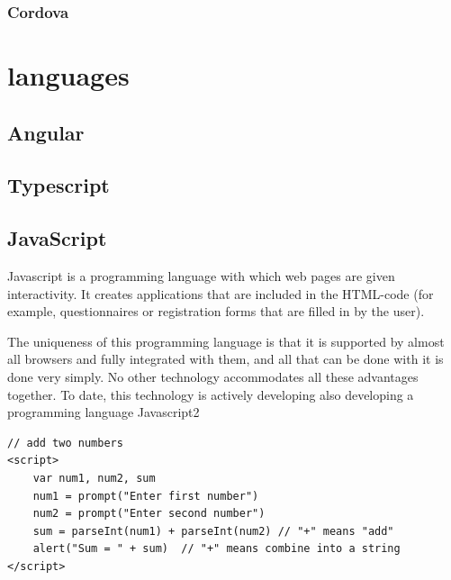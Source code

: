 \subsubsection{Cordova}

\section{languages}

\subsection{Angular}

\subsection{Typescript}

\subsection{JavaScript}
Javascript is a programming language with which web pages are given interactivity. It creates applications that are included in the HTML-code (for example, questionnaires or registration forms that are filled in by the user).\par The uniqueness of this programming language is that it is supported by almost all browsers and fully integrated with them, and all that can be done with it is done very simply. No other technology accommodates all these advantages together. To date, this technology is actively developing also developing a programming language Javascript2 \cite{JavaScript}

\begin{verbatim}
// add two numbers
<script>
    var num1, num2, sum
    num1 = prompt("Enter first number")
    num2 = prompt("Enter second number")
    sum = parseInt(num1) + parseInt(num2) // "+" means "add"
    alert("Sum = " + sum)  // "+" means combine into a string
</script>
\end{verbatim}
\cite{JavaScriptCode}

